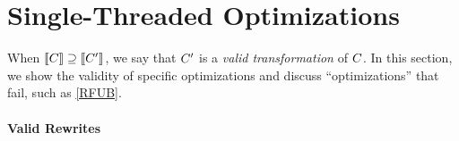 \section{Single-Threaded Optimizations}
\label{sec:opt}

When $\llbracket C\rrbracket \supseteq \llbracket C'\rrbracket$, we say that $C'$ is a
\emph{valid transformation} of $C$.  In this section, we show the
validity of specific optimizations and discuss ``optimizations'' that fail,
such as \ref{RFUB}.

\paragraph{Valid Rewrites}




